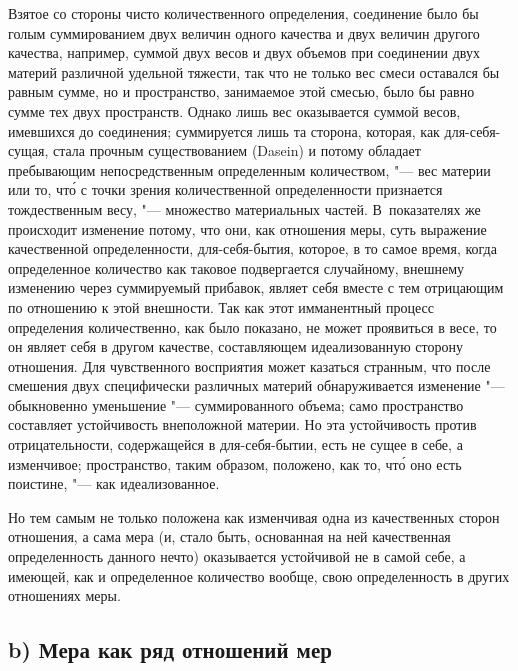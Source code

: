 Взятое со стороны чисто количественного определения, соединение было бы голым
суммированием двух величин одного качества и двух величин другого качества,
например, суммой двух весов и двух объемов при соединении двух материй
различной удельной тяжести, так что не только вес смеси оставался бы равным
сумме, но и пространство, занимаемое этой смесью, было бы равно сумме тех двух
пространств. Однако лишь вес оказывается суммой весов, имевшихся до соединения;
суммируется лишь та сторона, которая, как для-себя-сущая, стала прочным
существованием (Dasein) и потому обладает пребывающим непосредственным
определенным количеством, "--- вес материи или то, чт\'{о} с точки зрения
количественной определенности признается тождественным весу, "--- множество
материальных частей. В~показателях же происходит изменение потому, что они, как
отношения меры, суть выражение качественной определенности, для-себя-бытия,
которое, в то самое время, когда определенное количество как таковое
подвергается случайному, внешнему изменению через суммируемый прибавок, являет
себя вместе с тем отрицающим по отношению к этой внешности. Так как этот
имманентный процесс определения количественно, как было показано, не может
проявиться в весе, то он являет себя в другом качестве, составляющем
идеализованную сторону отношения. Для чувственного восприятия может казаться
странным, что после смешения двух специфически различных материй обнаруживается
изменение "--- обыкновенно уменьшение "--- суммированного объема; само
пространство составляет устойчивость внеположной материи. Но эта устойчивость
против отрицательности, содержащейся в для-себя-бытии, есть не сущее в себе, а
изменчивое; пространство, таким образом, положено, как то, чт\'{о} оно есть
поистине, "--- как идеализованное.

Но тем самым не только положена как изменчивая одна из качественных сторон
отношения, а сама мера (и, стало быть, основанная на ней качественная
определенность данного нечто) оказывается устойчивой не в самой себе, а
имеющей, как и определенное количество вообще, свою определенность в других
отношениях меры.

\subsection[b) Мера как ряд отношений мер]{b) Мера как ряд отношений мер}


